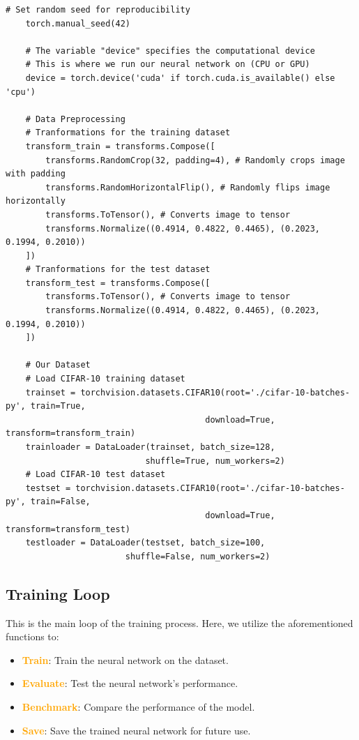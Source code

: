 \begin{lstlisting}[caption={Data Preparation}, label={lst:data_prep}]
    # Set random seed for reproducibility
    torch.manual_seed(42)

    # The variable "device" specifies the computational device 
    # This is where we run our neural network on (CPU or GPU)
    device = torch.device('cuda' if torch.cuda.is_available() else 'cpu')

    # Data Preprocessing 
    # Tranformations for the training dataset
    transform_train = transforms.Compose([
        transforms.RandomCrop(32, padding=4), # Randomly crops image with padding
        transforms.RandomHorizontalFlip(), # Randomly flips image horizontally
        transforms.ToTensor(), # Converts image to tensor
        transforms.Normalize((0.4914, 0.4822, 0.4465), (0.2023, 0.1994, 0.2010))
    ])
    # Tranformations for the test dataset
    transform_test = transforms.Compose([
        transforms.ToTensor(), # Converts image to tensor
        transforms.Normalize((0.4914, 0.4822, 0.4465), (0.2023, 0.1994, 0.2010))
    ])

    # Our Dataset
    # Load CIFAR-10 training dataset
    trainset = torchvision.datasets.CIFAR10(root='./cifar-10-batches-py', train=True,
                                        download=True, transform=transform_train)
    trainloader = DataLoader(trainset, batch_size=128,
                            shuffle=True, num_workers=2)
    # Load CIFAR-10 test dataset
    testset = torchvision.datasets.CIFAR10(root='./cifar-10-batches-py', train=False,
                                        download=True, transform=transform_test)
    testloader = DataLoader(testset, batch_size=100,
                        shuffle=False, num_workers=2)
\end{lstlisting}

\subsection{Training Loop}
This is the main loop of the training process. Here, we utilize the aforementioned functions to:
\begin{itemize}[noitemsep]
    \item \textcolor{orange}{\textbf{Train}}: Train the neural network on the dataset.
    \item \textcolor{orange}{\textbf{Evaluate}}: Test the neural network's performance.
    \item \textcolor{orange}{\textbf{Benchmark}}: Compare the performance of the model.
    \item \textcolor{orange}{\textbf{Save}}: Save the trained neural network for future use.
\end{itemize}

